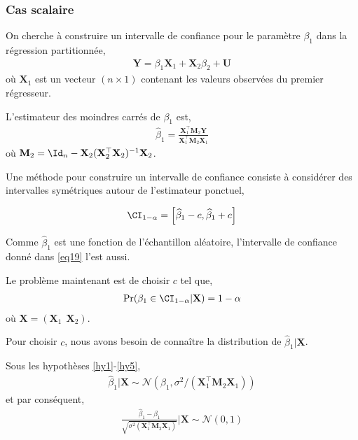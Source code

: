 \begin{frame}[allowframebreaks]\frametitle{Cas scalaire}

On cherche à construire un intervalle de confiance pour le paramètre $\beta_1$ dans la régression partitionnée,
\begin{align*}
\mathbf{Y} = \beta_1\mathbf{X}_1+\mathbf{X}_2\beta_2 + \mathbf{U}
\end{align*}
où $\mathbf{X}_1$ est un vecteur $(n\times 1)$ contenant les valeurs observées du premier régresseur.

\medskip

L'estimateur des moindres carrés de $\beta_1$ est,
\begin{align*}
\widehat{\beta}_1 = \frac{\mathbf{X}_1^\top\mathbf{M}_2\mathbf{Y}}{\mathbf{X}_1^\top\mathbf{M}_2\mathbf{X}_1}
\end{align*}
où $\mathbf{M}_2 = \Id_n - \mathbf{X}_2(\mathbf{X}_2^\top\mathbf{X}_2)^{-1}\mathbf{X}_2$. 

\medskip

 Une méthode pour construire un intervalle de confiance consiste à considérer des intervalles symétriques autour de l'estimateur ponctuel,
 
\begin{align}
\CI_{1-\alpha} = \left[\widehat{\beta}_1- c,  \widehat{\beta}_1+c\right]
\label{eq19}
\end{align}

Comme $\widehat{\beta}_1$ est une fonction de l'échantillon aléatoire, l'intervalle de confiance donné dans \eqref{eq19} l'est aussi. 

\medskip
Le problème maintenant est de choisir $c$ tel que,
\begin{align*}
\Pr(\beta_1 \in \CI_{1-\alpha}| \mathbf{X}) = 1-\alpha
\end{align*}
où $\mathbf{X} = (\mathbf{X}_1 \ \ \mathbf{X}_2)$. 

\medskip

Pour choisir $c$, nous avons besoin de connaître la distribution de $\widehat{\beta}_1|\mathbf{X}$. 

\framebreak

Sous les hypothèses \ref{hy1}-\ref{hy5},
\begin{align*}
\widehat{\beta}_1|\mathbf{X} \sim \mathcal{N}\left(\beta_1, \sigma^2/(\mathbf{X}_1^\top\mathbf{M}_2\mathbf{X}_1)\right)
\end{align*}
et par conséquent,
\begin{align}
\frac{\widehat{\beta}_1-\beta_1 }{\sqrt{\sigma^2
(\mathbf{X}_1^\top\mathbf{M}_2\mathbf{X}_1)}} | \mathbf{X} \sim \mathcal{N}(0, 1)
\label{eq20}
\end{align}


\end{frame}

